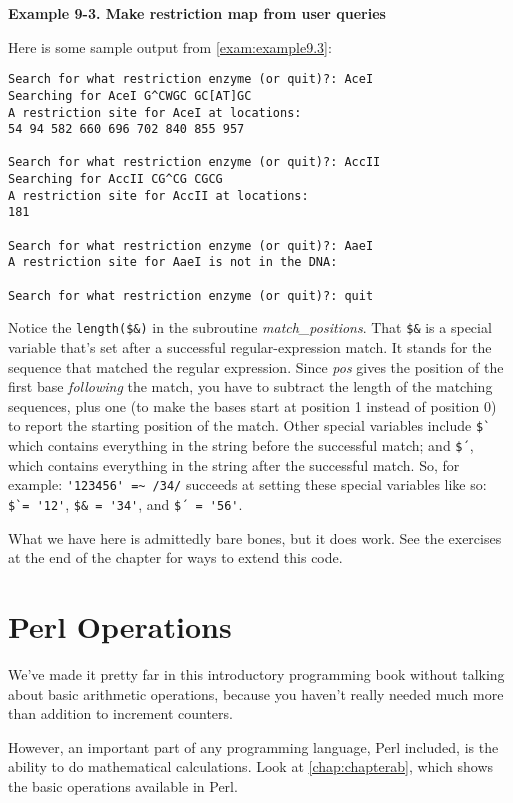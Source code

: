 \textbf{Example 9-3. Make restriction map from user queries}


Here is some sample output from \autoref{exam:example9.3}:

\begin{lstlisting}
Search for what restriction enzyme (or quit)?: AceI
Searching for AceI G^CWGC GC[AT]GC
A restriction site for AceI at locations:
54 94 582 660 696 702 840 855 957

Search for what restriction enzyme (or quit)?: AccII
Searching for AccII CG^CG CGCG
A restriction site for AccII at locations:
181

Search for what restriction enzyme (or quit)?: AaeI
A restriction site for AaeI is not in the DNA:

Search for what restriction enzyme (or quit)?: quit
\end{lstlisting}

Notice the \verb|length($&)| in the subroutine \textit{match\_positions}. That \verb|$&| is a special variable that's set after a successful regular-expression match. It stands for the sequence that matched the regular expression. Since \textit{pos} gives the position of the first base \textit{following} the match, you have to subtract the length of the matching sequences, plus one (to make the bases start at position 1 instead of position 0) to report the starting position of the match. Other special variables include \verb|$`| which contains everything in the string before the successful match; and \verb|$´|, which contains everything in the string after the successful match. So, for example: \verb|'123456' =~ /34/| succeeds at setting these special variables like so: \verb|$`= '12'|, \verb|$& = '34'|, and \verb|$´ = '56'|.

What we have here is admittedly bare bones, but it does work. See the exercises at the end of the chapter for ways to extend this code. 

\section{Perl Operations}
We've made it pretty far in this introductory programming book without talking about basic arithmetic operations, because you haven't really needed much more than addition to increment counters.

However, an important part of any programming language, Perl included, is the ability to do mathematical calculations. Look at \autoref{chap:chapterab}, which shows the basic operations available in Perl. 

